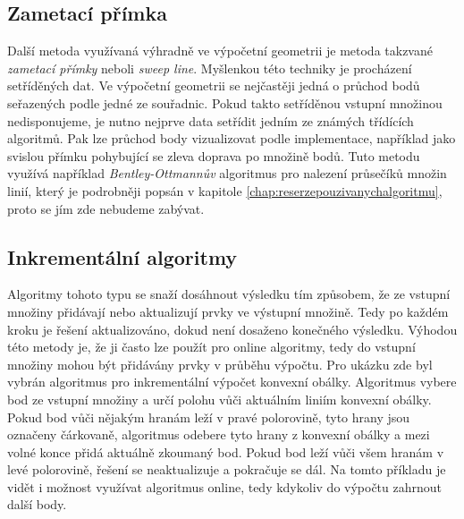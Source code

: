 \subsection{Zametací přímka}
Další metoda využívaná výhradně ve výpočetní geometrii je metoda
takzvané \textit{zametací přímky} neboli \textit{sweep
  line}. Myšlenkou této techniky je procházení setříděných dat. Ve
výpočetní geometrii se nejčastěji jedná o průchod bodů seřazených
podle jedné ze souřadnic. Pokud takto setříděnou vstupní množinou
nedisponujeme, je nutno nejprve data setřídit jedním ze známých
třídících algoritmů. Pak lze průchod body vizualizovat podle
implementace, například jako svislou přímku pohybující se zleva
doprava po množině bodů.  Tuto metodu využívá například
\textit{Bentley-Ottmannův} algoritmus pro nalezení průsečíků množin
linií, který je podrobněji popsán v kapitole
\ref{chap:reserzepouzivanychalgoritmu}, proto se jím zde nebudeme
zabývat.

\subsection{Inkrementální algoritmy}
Algoritmy tohoto typu se snaží dosáhnout výsledku tím způsobem, že ze
vstupní množiny přidávají nebo aktualizují prvky ve výstupní
množině. Tedy po každém kroku je řešení aktualizováno, dokud není
dosaženo konečného výsledku. Výhodou této metody je, že ji často lze
použít pro online algoritmy, tedy do vstupní množiny mohou být
přidávány prvky v průběhu výpočtu.  Pro ukázku zde byl vybrán
algoritmus pro inkrementální výpočet konvexní obálky. Algoritmus
vybere bod ze vstupní množiny a určí polohu vůči aktuálním liniím
konvexní obálky. Pokud bod vůči nějakým hranám leží v pravé
polorovině, tyto hrany jsou označeny čárkovaně, algoritmus odebere
tyto hrany z konvexní obálky a mezi volné konce přidá aktuálně
zkoumaný bod. Pokud bod leží vůči všem hranám v levé polorovině,
řešení se neaktualizuje a pokračuje se dál. Na tomto příkladu je vidět
i možnost využívat algoritmus online, tedy kdykoliv do výpočtu
zahrnout další body.

